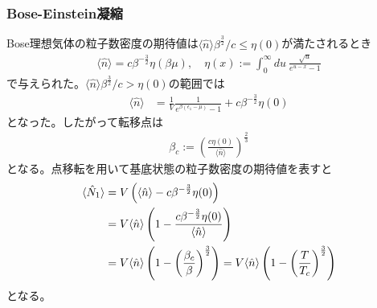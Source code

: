 \documentclass{jsarticle}  %
\numberwithin{equation}{section} %
\numberwithin{figure}{section}
\begin{document}
\subsubsection{Bose-Einstein凝縮}
    Bose理想気体の粒子数密度の期待値は$\langle \hat{n} \rangle \beta^{\frac{3}{2}} / c\le \eta (0)$が満たされるとき
    \begin{align}
        \langle \hat{n} \rangle = c \beta^{-\frac{3}{2}} \eta (\beta \mu), \quad \eta (x) := \int_0^{\infty} du\ \frac{\sqrt{u}}{e^{u - x} - 1}
    \end{align}
    で与えられた。$\langle \hat{n} \rangle \beta^{\frac{3}{2}} / c> \eta (0)$の範囲では
    \begin{align}
        \langle \hat{n} \rangle &= \frac{1}{V} \frac{1}{e^{\beta (\epsilon_1 - \mu)} - 1} + c \beta^{-\frac{3}{2}} \eta (0)
    \end{align}
    となった。したがって転移点は
    \begin{align}
        \beta_c := \left( \frac{c \eta (0)}{\langle \hat{n} \rangle } \right)^{\frac{2}{3}}
    \end{align}
    となる。点移転を用いて基底状態の粒子数密度の期待値を表すと
    \begin{align}
        \langle \hat{N}_1 \rangle &= V \left( \langle \hat{n} \rangle - c \beta^{-\frac{3}{2}} \eta (0) \right) \notag \\
        &= V \langle \hat{n} \rangle \left( 1 - \frac{c \beta^{-\frac{3}{2}} \eta (0)}{\langle \hat{n} \rangle} \right) \notag \\
        &= V \langle \hat{n} \rangle \left( 1 - \left( \frac{\beta_c}{\beta} \right)^{\frac{3}{2}} \right) = V \langle \hat{n} \rangle \left( 1 - \left( \frac{T}{T_c} \right)^{\frac{3}{2}} \right) 
    \end{align}
    となる。
\end{document}
